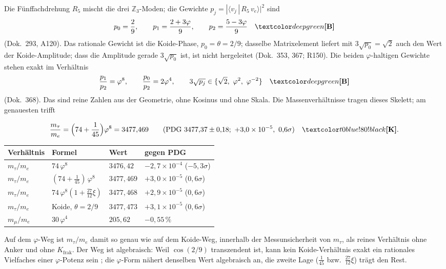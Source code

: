 Die Fünffachdrehung $R_5$ mischt die drei $\mathbb Z_3$-Moden; die
Gewichte $p_j=|\langle v_j\,|\,R_5\,v_e\rangle|^2$ sind
\begin{equation}
  p_0=\frac29,\qquad p_1=\frac{2+3\varphi}{9},\qquad p_2=\frac{5-3\varphi}{9}\quad\BM
\end{equation}
(Dok.~293, A120). Das rationale Gewicht ist die Koide-Phase, $p_0=\theta=2/9$; dasselbe
Matrixelement liefert mit $3\sqrt{p_0}=\sqrt2$ auch den Wert der Koide-Amplitude; dass die
Amplitude gerade $3\sqrt{p_0}$ ist, ist nicht hergeleitet \SM{} (Dok.~353, 367; R150). Die beiden
$\varphi$-haltigen Gewichte stehen exakt im Verhältnis
\begin{equation}
  \frac{p_1}{p_2}=\varphi^8,\qquad \frac{p_0}{p_2}=2\varphi^4,\qquad
  3\sqrt{p_j}\in\{\sqrt2,\ \varphi^2,\ \varphi^{-2}\}\quad\BM
\end{equation}
(Dok.~368). Das sind reine Zahlen aus der Geometrie, ohne Kosinus und ohne Skala. Die
Massenverhältnisse tragen dieses Skelett; am genauesten trifft
\begin{ffkern}
\begin{equation}
  \frac{m_\tau}{m_e}=\Bigl(74+\frac1{45}\Bigr)\varphi^8=3477{,}469\qquad
  (\text{PDG }3477{,}37\pm0{,}18;\ +3{,}0\times10^{-5},\ 0{,}6\sigma)\quad\KM .
\end{equation}
\end{ffkern}%
\begin{center}
\small
\begin{tabular}{@{}llll@{}}
\toprule
\textbf{Verhältnis} & \textbf{Formel} & \textbf{Wert} & \textbf{gegen PDG} \\
\midrule
$m_\tau/m_e$ & $74\,\varphi^8$ & $3476{,}42$ & $-2{,}7\times10^{-4}$ ($-5{,}3\sigma$) \\
$m_\tau/m_e$ & $(74+\tfrac1{45})\,\varphi^8$ & $3477{,}469$ & $+3{,}0\times10^{-5}$ ($0{,}6\sigma$) \\
$m_\tau/m_e$ & $74\,\varphi^8(1+\tfrac{27}{12}\xi)$ & $3477{,}468$ & $+2{,}9\times10^{-5}$ ($0{,}6\sigma$) \\
$m_\tau/m_e$ & Koide, $\theta=2/9$ & $3477{,}473$ & $+3{,}1\times10^{-5}$ ($0{,}6\sigma$) \\
$m_\mu/m_e$ & $30\,\varphi^4$ & $205{,}62$ & $-0{,}55\,\%$ \\
\bottomrule
\end{tabular}
\end{center}

Auf dem $\varphi$-Weg ist $m_\tau/m_e$ damit so genau wie auf dem Koide-Weg, innerhalb der
Messunsicherheit von $m_\tau$, als reines Verhältnis ohne Anker und ohne $K_{\text{frak}}$. Der
Weg ist algebraisch: Weil $\cos(2/9)$ transzendent ist, kann kein Koide-Verhältnis exakt ein
rationales Vielfaches einer $\varphi$-Potenz sein \BM; die $\varphi$-Form nähert denselben Wert
algebraisch an, die zweite Lage ($\tfrac1{45}$ bzw.\ $\tfrac{27}{12}\xi$) trägt den Rest.

